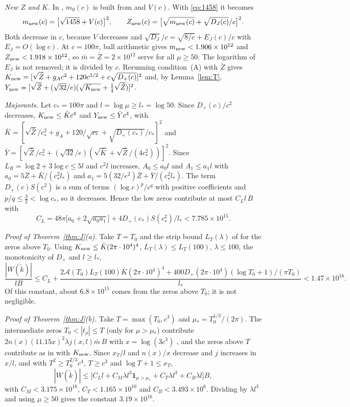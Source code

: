 \documentclass[11pt]{amsart}
\theoremstyle{remark}
\numberwithin{equation}{section}
\begin{document}
\emph{New $Z$ and $K$.} In \cite[(3.3)]{MoriWeilIII}, $m_0(c)$ is built from \cite[Lemma~4.1]{MoriWeilII} and $V(c)$. With \eqref{eq:1458} it becomes
\[
m_{\rm new}(c)=\bigl[\sqrt{1458}+V(c)\bigr]^2,\qquad Z_{\rm new}(c)=\bigl[\sqrt{m_{\rm new}(c)}+\sqrt{D_J(c)}/c\bigr]^2 .
\]
Both decrease in $c$, because $V$ decreases and $\sqrt{D_J}/c=\sqrt{8/c}+E_J(c)/c$ with $E_J=O(\log c)$. At $c=100\pi$, ball arithmetic gives $m_{\rm new}<1.906\times10^{12}$ and $Z_{\rm new}<1.918\times10^{12}$, so $\bar m=\bar Z=2\times10^{12}$ serve for all $\mu\ge50$. The logarithm of $E_J$ is not removed; it is divided by $c$. Rerunning condition~(A) \cite[Prop.~5.3]{MoriWeilIII} with $\bar Z$ gives $K_{\rm new}=[\sqrt{\bar Z}+g_Ac^2+120c^{3/2}+c\sqrt{D_+(c)}]^2$ and, by Lemma~\ref{lem:T}, $Y_{\rm new}=[\sqrt{\bar Z}+(\sqrt{32}/e)(\sqrt{K_{\rm new}}+\frac14\sqrt{\bar Z})]^2$.

\emph{Majorants.} Let $c_*=100\pi$ and $l=\log\mu\ge l_*=\log50$. Since $D_+(c)/c^2$ decreases, $K_{\rm new}\le\bar Kc^4$ and $Y_{\rm new}\le\bar Yc^4$, with $\bar K=[\sqrt{\bar Z}/c_*^2+g_A+120/\sqrt{c_*}+\sqrt{D_+(c_*)}/c_*]^2$ and $\bar Y=[\sqrt{\bar Z}/c_*^2+(\sqrt{32}/e)(\sqrt{\bar K}+\sqrt{\bar Z}/(4c_*^2))]^2$. Since $L_R=\log2+3\log c\le5l$ and $c^2l$ increases, $A_0\le a_0l$ and $A_1\le a_1l$ with $a_0=5\bar Z+\bar K/(c_*^2l_*)$ and $a_1=5(32/e^2)\bar Z+\bar Y/(c_*^2l_*)$. The term $D_+(c)S(c^2)$ is a sum of terms $(\log c)^p/c^q$ with positive coefficients and $p/q\le\frac32<\log c_*$, so it decreases. Hence the low zeros contribute at most $C_Ll\,B$ with
\[
C_L=48\pi\bigl[a_0+2\sqrt{a_0a_1}\bigr]+4D_+(c_*)S(c_*^2)/l_*<7.785\times10^{15}.
\]

\emph{Proof of Theorem~\ref{thm:J}(a).} Take $T=T_0$ and the strip bound $L_T(\lambda)$ of \cite{MoriWeilIII} for the zeros above $T_0$. Using $K_{\rm new}\le\bar K(2\pi\cdot10^4)^4$, $L_T(\lambda)\le L_T(100)$, $\lambda\le100$, the monotonicity of $D_+$ and $l\ge l_*$,
\[
\frac{|W(\tilde k)|}{lB}\le C_L+\frac{2\mathcal A(T_0)L_T(100)\bar K(2\pi\cdot10^4)^4+400D_+(2\pi\cdot10^4)(\log T_0+1)/(\pi T_0)}{l_*}<1.47\times10^{16}.
\]
Of this constant, about $6.8\times10^{15}$ comes from the zeros above $T_0$; it is not negligible.

\emph{Proof of Theorem~\ref{thm:J}(b).} Take $T=\max(T_0,c^3)$ and $\mu_*=T_0^{1/3}/(2\pi)$. The intermediate zeros $T_0<|t_\rho|\le T$ (only for $\mu>\mu_*$) contribute $2n(x)(11.15x)^2\lambda j(x,l)\bar m\,B$ with $x=\log(3c^3)$ \cite[Section~6]{MoriWeilIII}, and the zeros above $T$ contribute as in \cite{MoriWeilIII} with $K_{\rm new}$. Since $x_T/l$ and $n(x)/x$ decrease and $j$ increases in $x/l$, and with $T^2\ge T_0^{2/3}c^4$, $T\ge c^3$ and $\log T+1\le x_T$,
\[
|W(\tilde k)|\le\bigl[C_Ll+C_M\lambda l^3\mathbf 1_{\mu>\mu_*}+C_T\lambda l^3+C_B\lambda l\bigr]B,
\]
with $C_M<3.175\times10^{16}$, $C_T<1.165\times10^{10}$ and $C_B<3.493\times10^6$. Dividing by $\lambda l^3$ and using $\mu\ge50$ gives the constant $3.19\times10^{16}$.
\end{document}

